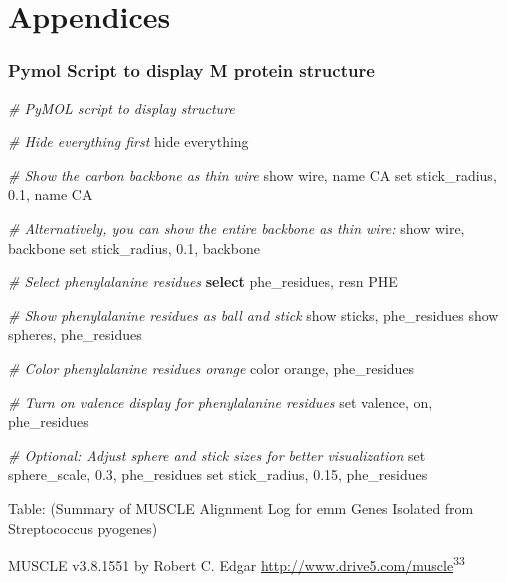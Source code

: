 \documentclass[
]{article}
\newenvironment{Shaded}{\begin{snugshade}}{\end{snugshade}}
\newcommand{\BuiltInTok}[1]{#1}
\newcommand{\CommentTok}[1]{\textcolor[rgb]{0.56,0.35,0.01}{\textit{#1}}}
\newcommand{\ControlFlowTok}[1]{\textcolor[rgb]{0.13,0.29,0.53}{\textbf{#1}}}
\newcommand{\ExtensionTok}[1]{#1}
\newcommand{\NormalTok}[1]{#1}
\begin{document}
\newpage

\section{Appendices}\label{appendices}

\subsubsection{Pymol Script to display M protein
structure}\label{pymol-script-to-display-m-protein-structure}

\begin{Shaded}
\begin{Highlighting}[]
\CommentTok{\# PyMOL script to display structure}

\CommentTok{\# Hide everything first}
\ExtensionTok{hide}\NormalTok{ everything}

\CommentTok{\# Show the carbon backbone as thin wire}
\ExtensionTok{show}\NormalTok{ wire, name CA}
\BuiltInTok{set}\NormalTok{ stick\_radius, 0.1, name CA}

\CommentTok{\# Alternatively, you can show the entire backbone as thin wire:}
\ExtensionTok{show}\NormalTok{ wire, backbone}
\BuiltInTok{set}\NormalTok{ stick\_radius, 0.1, backbone}

\CommentTok{\# Select phenylalanine residues}
\ControlFlowTok{select}\NormalTok{ phe\_residues}\ExtensionTok{,}\NormalTok{ resn PHE}

\CommentTok{\# Show phenylalanine residues as ball and stick}
\ExtensionTok{show}\NormalTok{ sticks, phe\_residues}
\ExtensionTok{show}\NormalTok{ spheres, phe\_residues}

\CommentTok{\# Color phenylalanine residues orange}
\ExtensionTok{color}\NormalTok{ orange, phe\_residues}

\CommentTok{\# Turn on valence display for phenylalanine residues}
\BuiltInTok{set}\NormalTok{ valence, on, phe\_residues}

\CommentTok{\# Optional: Adjust sphere and stick sizes for better visualization}
\BuiltInTok{set}\NormalTok{ sphere\_scale, 0.3, phe\_residues}
\BuiltInTok{set}\NormalTok{ stick\_radius, 0.15, phe\_residues}
\end{Highlighting}
\end{Shaded}

\newpage

Table: (Summary of MUSCLE Alignment Log for emm Genes Isolated from
Streptococcus pyogenes)

MUSCLE v3.8.1551 by Robert C. Edgar \textbar{}
\url{http://www.drive5.com/muscle}\textsuperscript{33}
\end{document}
